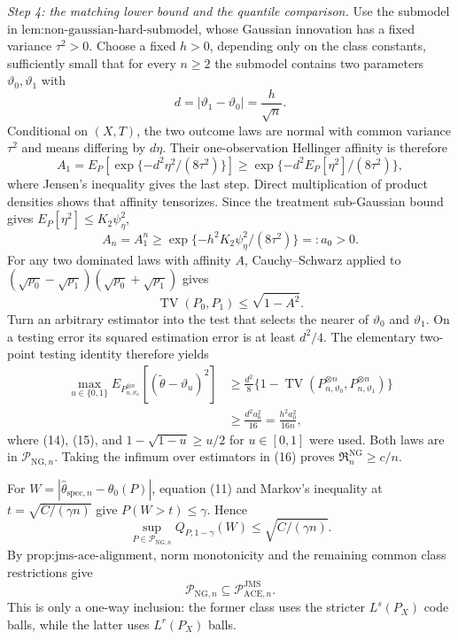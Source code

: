 \emph{Step 4: the matching lower bound and the quantile comparison.}
Use the submodel in \(\text{lem:non-gaussian-hard-submodel}\), whose
Gaussian innovation has a fixed variance \(\tau^2>0\).  Choose a fixed
\(h>0\), depending only on the class constants, sufficiently small that
for every \(n\ge2\) the submodel contains two parameters
\(\vartheta_0,\vartheta_1\) with
\[
 d=|\vartheta_1-\vartheta_0|=\frac h{\sqrt n}.
\]
Conditional on \((X,T)\), the two outcome laws are normal with common
variance \(\tau^2\) and means differing by \(d\eta\).  Their
one-observation Hellinger affinity is therefore
\[
 A_1=E_P\!\left[\exp\{-d^2\eta^2/(8\tau^2)\}\right]
 \ge \exp\{-d^2E_P[\eta^2]/(8\tau^2)\},                \tag{13}
\]
where Jensen's inequality gives the last step.  Direct multiplication of
product densities shows that affinity tensorizes.  Since the treatment
sub-Gaussian bound gives \(E_P[\eta^2]\le K_2\psi_{\eta}^2\),
\[
 A_n=A_1^n
 \ge \exp\{-h^2K_2\psi_{\eta}^2/(8\tau^2)\}
 =:a_0>0.                                               \tag{14}
\]
For any two dominated laws with affinity \(A\), Cauchy--Schwarz applied
to \((\sqrt{p_0}-\sqrt{p_1})(\sqrt{p_0}+\sqrt{p_1})\) gives
\[
 \operatorname{TV}(P_0,P_1)\le\sqrt{1-A^2}.            \tag{15}
\]
Turn an arbitrary estimator into the test that selects the nearer of
\(\vartheta_0\) and \(\vartheta_1\).  On a testing error its squared
estimation error is at least \(d^2/4\).  The elementary two-point testing
identity therefore yields
\[
 \begin{aligned}
 \max_{u\in\{0,1\}}
 E_{P_{n,\vartheta_u}^{\otimes n}}
 [ (\widetilde\theta-\vartheta_u)^2]
 &\ge \frac{d^2}{8}
 \{1-\operatorname{TV}(P_{n,\vartheta_0}^{\otimes n},
                       P_{n,\vartheta_1}^{\otimes n})\}\\
 &\ge \frac{d^2a_0^2}{16}
 =\frac{h^2a_0^2}{16n},                                 \tag{16}
 \end{aligned}
\]
where (14), (15), and \(1-\sqrt{1-u}\ge u/2\) for
\(u\in[0,1]\) were used.  Both laws are in
\(\mathcal P_{\mathrm{NG},n}\).  Taking the infimum over estimators in
(16) proves \(\mathfrak R_n^{\mathrm{NG}}\ge c/n\).

For \(W=|\widehat\theta_{\mathrm{spec},n}-\theta_0(P)|\), equation
(11) and Markov's inequality at \(t=\sqrt{C/(\gamma n)}\) give
\(P(W>t)\le\gamma\).  Hence
\[
 \sup_{P\in\mathcal P_{\mathrm{NG},n}}
 Q_{P,1-\gamma}(W)\le\sqrt{C/(\gamma n)}.               \tag{17}
\]
By \(\text{prop:jms-ace-alignment}\), norm monotonicity and the remaining
common class restrictions give
\[
 \mathcal P_{\mathrm{NG},n}
 \subseteq\mathcal P_{\mathrm{ACE},n}^{\mathrm{JMS}}.   \tag{18}
\]
This is only a one-way inclusion: the former class uses the stricter
\(L^s(P_X)\) code balls, while the latter uses \(L^r(P_X)\) balls.

